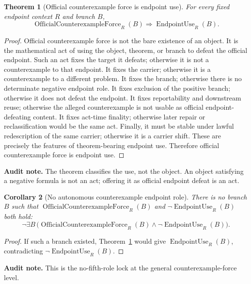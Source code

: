 \documentclass[11pt]{article}
\newtheorem{theorem}{Theorem}[section]
\newtheorem{corollary}[theorem]{Corollary}
\newcommand{\EndpointUse}{\operatorname{EndpointUse}}
\newcommand{\OfficialCounterexampleForce}{\operatorname{OfficialCounterexampleForce}}
\begin{document}
\begin{theorem}[Official counterexample force is endpoint use]\label{thm:official-counterexample-force-endpoint-use}
For every fixed endpoint context $R$ and branch $B$,
\[
\OfficialCounterexampleForce_R(B)\Rightarrow\EndpointUse_R(B).
\]
\end{theorem}
\begin{proof}
Official counterexample force is not the bare existence of an object.  It is the mathematical act of using the object, theorem, or branch to defeat the official endpoint.  Such an act fixes the target it defeats; otherwise it is not a counterexample to that endpoint.  It fixes the carrier; otherwise it is a counterexample to a different problem.  It fixes the branch; otherwise there is no determinate negative endpoint role.  It fixes exclusion of the positive branch; otherwise it does not defeat the endpoint.  It fixes reportability and downstream reuse; otherwise the alleged counterexample is not usable as official endpoint-defeating content.  It fixes act-time finality; otherwise later repair or reclassification would be the same act.  Finally, it must be stable under lawful redescription of the same carrier; otherwise it is a carrier shift.  These are precisely the features of theorem-bearing endpoint use.  Therefore official counterexample force is endpoint use.
\end{proof}
\par\noindent\textbf{Audit note.} The theorem classifies the use, not the object.  An object satisfying a negative formula is not an act; offering it as official endpoint defeat is an act.

\begin{corollary}[No autonomous counterexample endpoint role]\label{cor:no-autonomous-counterexample-role}
There is no branch $B$ such that $\OfficialCounterexampleForce_R(B)$ and $\neg\EndpointUse_R(B)$ both hold:
\[
\neg\exists B\,\bigl(\OfficialCounterexampleForce_R(B)\wedge\neg\EndpointUse_R(B)\bigr).
\]
\end{corollary}
\begin{proof}
If such a branch existed, Theorem~\ref{thm:official-counterexample-force-endpoint-use} would give $\EndpointUse_R(B)$, contradicting $\neg\EndpointUse_R(B)$.
\end{proof}
\par\noindent\textbf{Audit note.} This is the no-fifth-role lock at the general counterexample-force level.
\end{document}
